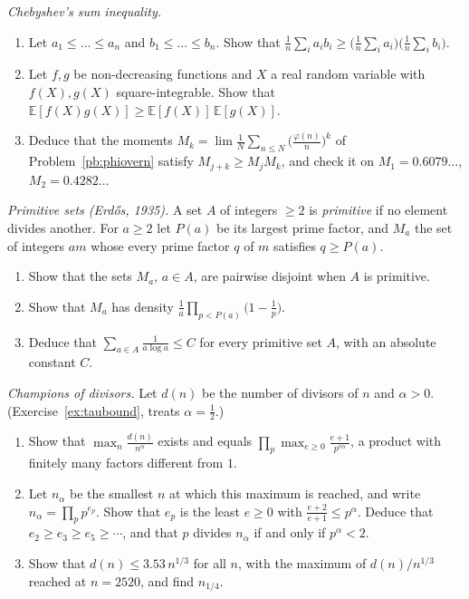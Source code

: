 \begin{exercise}[$\star$]\label{pb:chebyshevsum}
\emph{Chebyshev's sum inequality.}
\begin{enumerate}[label=(\alph*)]
\item Let $a_1\le\dots\le a_n$ and $b_1\le\dots\le b_n$. Show that $\frac1n\sum_ia_ib_i\ge\bigl(\frac1n\sum_ia_i\bigr)\bigl(\frac1n\sum_ib_i\bigr)$.
\item Let $f,g$ be non-decreasing functions and $X$ a real random variable with $f(X),g(X)$ square-integrable. Show that
$\mathbb E[f(X)g(X)]\ge\mathbb E[f(X)]\,\mathbb E[g(X)]$.
\item Deduce that the moments $M_k=\lim\frac1N\sum_{n\le N}\bigl(\frac{\varphi(n)}n\bigr)^k$ of Problem~\ref{pb:phiovern} satisfy
$M_{j+k}\ge M_jM_k$, and check it on $M_1=0.6079\ldots$, $M_2=0.4282\ldots$
\end{enumerate}
\end{exercise}

\begin{exercise}[$\star\star$]\label{pb:primitive}
\emph{Primitive sets (Erdős, 1935).} A set $A$ of integers $\ge2$ is \emph{primitive} if no element divides another. For $a\ge2$ let $P(a)$ be
its largest prime factor, and $M_a$ the set of integers $am$ whose every prime factor $q$ of $m$ satisfies $q\ge P(a)$.
\begin{enumerate}[label=(\alph*)]
\item Show that the sets $M_a$, $a\in A$, are pairwise disjoint when $A$ is primitive.
\item Show that $M_a$ has density $\frac1a\prod_{p<P(a)}\bigl(1-\frac1p\bigr)$.
\item Deduce that $\sum_{a\in A}\frac1{a\log a}\le C$ for every primitive set $A$, with an absolute constant $C$.
\end{enumerate}
\end{exercise}

\begin{exercise}[$\star\star$]\label{pb:divisorbound}
\emph{Champions of divisors.} Let $d(n)$ be the number of divisors of $n$ and $\alpha>0$. (Exercise~\ref{ex:taubound}, treats $\alpha=\frac12$.)
\begin{enumerate}[label=(\alph*)]
\item Show that $\max_n\frac{d(n)}{n^\alpha}$ exists and equals $\prod_p\max_{e\ge0}\frac{e+1}{p^{e\alpha}}$, a product with finitely many factors
different from $1$.
\item Let $n_\alpha$ be the smallest $n$ at which this maximum is reached, and write $n_\alpha=\prod_pp^{e_p}$. Show that $e_p$ is the least
$e\ge0$ with $\frac{e+2}{e+1}\le p^\alpha$. Deduce that $e_2\ge e_3\ge e_5\ge\cdots$, and that $p$ divides $n_\alpha$ if and only if $p^\alpha<2$.
\item Show that $d(n)\le3.53\,n^{1/3}$ for all $n$, with the maximum of $d(n)/n^{1/3}$ reached at $n=2520$, and find $n_{1/4}$.
\end{enumerate}
\end{exercise}

